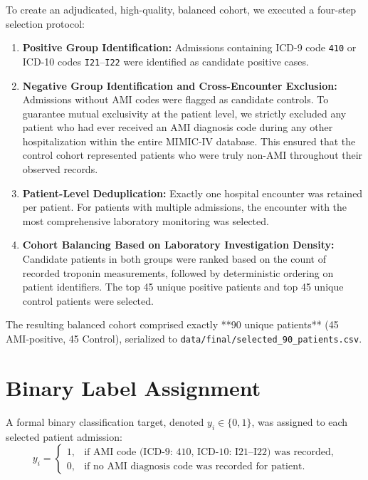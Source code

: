 \documentclass[12pt,a4paper,oneside]{report}
\begin{document}
To create an adjudicated, high-quality, balanced cohort, we executed a four-step selection protocol:
\begin{enumerate}
    \item \textbf{Positive Group Identification:} Admissions containing ICD-9 code \texttt{410} or ICD-10 codes \texttt{I21}--\texttt{I22} were identified as candidate positive cases.
    \item \textbf{Negative Group Identification and Cross-Encounter Exclusion:} Admissions without AMI codes were flagged as candidate controls. To guarantee mutual exclusivity at the patient level, we strictly excluded any patient who had ever received an AMI diagnosis code during any other hospitalization within the entire MIMIC-IV database. This ensured that the control cohort represented patients who were truly non-AMI throughout their observed records.
    \item \textbf{Patient-Level Deduplication:} Exactly one hospital encounter was retained per patient. For patients with multiple admissions, the encounter with the most comprehensive laboratory monitoring was selected.
    \item \textbf{Cohort Balancing Based on Laboratory Investigation Density:} Candidate patients in both groups were ranked based on the count of recorded troponin measurements, followed by deterministic ordering on patient identifiers. The top 45 unique positive patients and top 45 unique control patients were selected.
\end{enumerate}

The resulting balanced cohort comprised exactly **90 unique patients** (45 AMI-positive, 45 Control), serialized to \texttt{data/final/selected\_90\_patients.csv}.

\section{Binary Label Assignment}
\label{sec:label_assignment}

A formal binary classification target, denoted $y_i \in \{0, 1\}$, was assigned to each selected patient admission:
\begin{equation}
y_i = 
\begin{cases} 
1, & \text{if AMI code (ICD-9: 410, ICD-10: I21--I22) was recorded,} \\
0, & \text{if no AMI diagnosis code was recorded for patient.}
\end{cases}
\end{equation}
\end{document}
